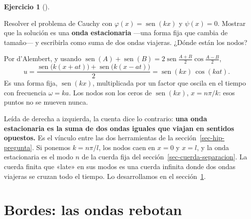 \documentclass[
  spanish,
  a4paper,
]{scrbook}
\theoremstyle{definition}
\theoremstyle{plain}
\theoremstyle{definition}
\theoremstyle{plain}
\theoremstyle{definition}
\newtheorem{exercise}{Ejercicio}[chapter]
\theoremstyle{remark}
\begin{document}
\begin{exercise}[]\protect\hypertarget{exr-hip-estacionaria}{}\label{exr-hip-estacionaria}

Resolver el problema de Cauchy con
\(\varphi(x) = \operatorname{sen}(kx)\) y \(\psi(x) = 0\). Mostrar que
la solución es una \textbf{onda estacionaria} ---una forma fija que
cambia de tamaño--- y escribirla como suma de dos ondas viajeras. ¿Dónde
están los nodos?

\end{exercise}

\begin{tcolorbox}[enhanced jigsaw, arc=.35mm, bottomrule=.15mm, bottomtitle=1mm, breakable, colback=white, colbacktitle=quarto-callout-tip-color!10!white, colframe=quarto-callout-tip-color-frame, coltitle=black, left=2mm, leftrule=.75mm, opacityback=0, opacitybacktitle=0.6, rightrule=.15mm, title=\textcolor{quarto-callout-tip-color}{\faLightbulb}\hspace{0.5em}{Solución}, titlerule=0mm, toprule=.15mm, toptitle=1mm]

Por d'Alembert, y usando
\(\operatorname{sen}(A)+\operatorname{sen}(B) = 2\operatorname{sen}\tfrac{A+B}2\cos\tfrac{A-B}2\),
\[
u = \frac{\operatorname{sen}\big(k(x+at)\big) + \operatorname{sen}\big(k(x-at)\big)}{2}
= \operatorname{sen}(kx)\,\cos(kat) .
\] Es una forma fija, \(\operatorname{sen}(kx)\), multiplicada por un
factor que oscila en el tiempo con frecuencia \(\omega = ka\). Los nodos
son los ceros de \(\operatorname{sen}(kx)\), \(x = n\pi/k\): esos puntos
no se mueven nunca.

Leída de derecha a izquierda, la cuenta dice lo contrario: \textbf{una
onda estacionaria es la suma de dos ondas iguales que viajan en sentidos
opuestos.} Es el vínculo entre las dos herramientas de la
sección~\ref{sec-hip-pregunta}. Si ponemos \(k = n\pi/l\), los nodos
caen en \(x = 0\) y \(x = l\), y la onda estacionaria es el modo \(n\)
de la cuerda fija del sección~\ref{sec-cuerda-separacion}. La cuerda
finita que «late» en sus modos es una cuerda infinita donde dos ondas
viajeras se cruzan todo el tiempo. Lo desarrollamos en el
sección~\ref{sec-hip-reflexiones}.

\end{tcolorbox}

\section{Bordes: las ondas rebotan}\label{sec-hip-reflexiones}
\end{document}
